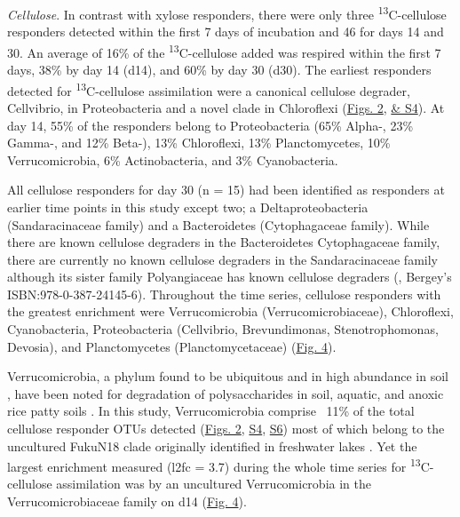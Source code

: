 \textit{Cellulose}. In contrast with xylose responders, there were only three \textsuperscript{13}C-cellulose responders detected within the first 7 days of incubation and 46 for days 14 and 30. An average of 16\% of the \textsuperscript{13}C-cellulose added was respired within the first 7 days, 38\% by day 14 (d14), and 60\% by day 30 (d30). The earliest responders detected for \textsuperscript{13}C-cellulose assimilation were a canonical cellulose degrader, Cellvibrio, in Proteobacteria and a novel clade in Chloroflexi (\href{https://www.authorea.com/users/3537/articles/3612/master/file/figures/l2fc_fig1/l2fc_fig.pdf}{Figs. 2}, \href{https://authorea.com/users/3537/articles/8459/master/file/figures/l2fc_fig_pVal/l2fc_fig_pVal.png}{& S4}). At day 14, 55\% of the responders belong to Proteobacteria (65\% Alpha-, 23\% Gamma-, and 12\% Beta-), 13\% Chloroflexi, 13\% Planctomycetes, 10\% Verrucomicrobia, 6\% Actinobacteria, and 3\% Cyanobacteria.

All cellulose responders for day 30 (n = 15) had been identified as responders at earlier time points in this study except two; a Deltaproteobacteria (Sandaracinaceae family) and a Bacteroidetes (Cytophagaceae family). While there are known cellulose degraders in the Bacteroidetes Cytophagaceae family, there are currently no known cellulose degraders in the Sandaracinaceae family although its sister family Polyangiaceae has known cellulose degraders (\cite{Reichenbach_2006}, Bergey's ISBN:978-0-387-24145-6). Throughout the time series, cellulose responders with the greatest enrichment were Verrucomicrobia (Verrucomicrobiaceae), Chloroflexi, Cyanobacteria, Proteobacteria (Cellvibrio, Brevundimonas, Stenotrophomonas, Devosia), and Planctomycetes (Planctomycetaceae) (\href{https://authorea.com/users/3537/articles/3612/master/file/figures/bacteria_tree/bacteria_tree.png}{Fig. 4}).      

Verrucomicrobia, a phylum found to be ubiquitous and in high abundance in soil \cite{Fierer_2013}, have been noted for degradation of polysaccharides in soil, aquatic, and anoxic rice patty soils \cite{Fierer_2013,Herlemann_2013,10543821}. In this study, Verrucomicrobia comprise ~11\% of the total cellulose responder OTUs detected (\href{https://www.authorea.com/users/3537/articles/3612/master/file/figures/l2fc_fig1/l2fc_fig.pdf}{Figs. 2}, \href{https://authorea.com/users/3537/articles/8459/master/file/figures/l2fc_fig_pVal/l2fc_fig_pVal.png}{S4}, \href{https://authorea.com/users/3537/articles/8459/master/file/figures/cellulose_resp_profiles/cellulose_resp_profiles.png}{S6}) most of which belong to the uncultured FukuN18 clade originally identified in freshwater lakes \cite{Parveen_2013}. Yet the largest enrichment measured (l2fc = 3.7) during the whole time series for \textsuperscript{13}C-cellulose assimilation was by an uncultured Verrucomicrobia in the Verrucomicrobiaceae family on d14 (\href{https://authorea.com/users/3537/articles/3612/master/file/figures/bacteria_tree/bacteria_tree.png}{Fig. 4}). 

